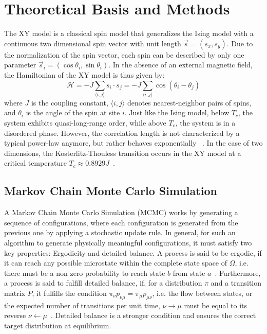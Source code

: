 \section{Theoretical Basis and Methods}
The XY model is a classical spin model that generalizes the Ising model with a continuous two dimensional spin vector with unit length $\vec{s} = (s_x, s_y)$.
Due to the normalization of the spin vector, each spin can be described by only one parameter $\vec{s}_i = (\cos\theta_i, \sin\theta_i)$.
In the absence of an external magnetic field, the Hamiltonian of the XY model is thus given by:
\begin{equation}
\mathcal{H} = -J \sum_{\langle i,j \rangle} s_i \cdot s_j = -J \sum_{\langle i,j \rangle} \cos(\theta_i - \theta_j)
\end{equation}
where $J$ is the coupling constant, $\langle i,j \rangle$ denotes nearest-neighbor pairs of spins, and $\theta_i$ is the angle of the spin at site $i$.
Just like the Ising model, below $T_c$, the system exhibits quasi-long-range order, while above $T_c$, the system is in a disordered phase.
However, the correlation length is not characterized by a typical power-law anymore, but rather behaves exponentially ~\cite{Kosterlitz1974}.
In the case of two dimensions, the Kosterlitz-Thouless transition occurs in the XY model at a critical temperature $T_c \approx 0.8929J$~\cite{Hasenbusch2005}.

\subsection{Markov Chain Monte Carlo Simulation}
A Markov Chain Monte Carlo Simulation (MCMC) works by generating a sequence of configurations, where each configuration is generated from the previous one by applying a stochastic update rule.
In general, for such an algorithm to generate physically meaningful configurations, it must satisfy two key properties: Ergodicity and detailed balance.
A process is said to be ergodic, if it can reach any possible microstate within the complete state space of $\Omega$, i.e. there must be a non zero probability to reach state $b$ from state $a$~\cite{PetschliesUrbach2026}.
Furthermore, a process is said to fulfill detailed balance, if, for a distribution $\pi$ and a transition matrix $P$, it fulfills the condition $\pi_\nu p_{\nu\mu} = \pi_\mu p_{\mu\nu}$, i.e. the flow between states, or the expected number of transitions per unit time, $\nu \rightarrow \mu$ must be equal to its reverse $\nu \leftarrow \mu$~\cite{PetschliesUrbach2026}.
Detailed balance is a stronger condition and ensures the correct target distribution at equilibrium.

